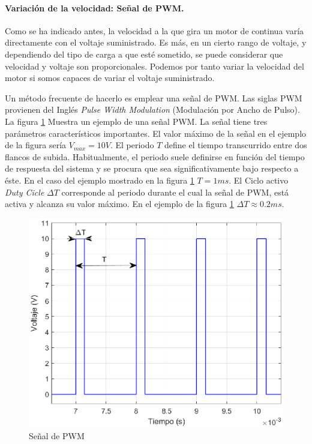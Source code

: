 \documentclass[10pt,a4paper]{report}
\begin{document}
\paragraph{Variación de la velocidad: Señal de PWM.}
Como se ha indicado antes, la velocidad a la que gira un motor de continua varía directamente con el voltaje suministrado. Es más, en un cierto rango de voltaje, y dependiendo del tipo de carga a que esté sometido, se puede considerar que velocidad y voltaje son proporcionales. Podemos por tanto variar la velocidad del motor si somos capaces de variar el voltaje suministrado.

Un método frecuente de hacerlo es emplear una señal de PWM. Las siglas PWM provienen del Inglés \emph{Pulse Width Modulation} (Modulación por Ancho de Pulso). La figura \ref{f9} Muestra un ejemplo de una señal PWM.
La señal tiene tres parámetros característicos importantes. 
El valor máximo de la señal en el ejemplo de la figura sería $V_{max}=10V$. El periodo $T$  define el tiempo transcurrido entre dos flancos de subida. Habitualmente, el periodo suele definirse en función del tiempo de respuesta del sistema y se procura que sea significativamente bajo respecto a éste. En el caso del ejemplo mostrado en la figura \ref{f9} $T=1 ms$. El Ciclo activo \emph{Duty Cicle} $\Delta T$ corresponde al periodo durante el cual la señal de PWM, está activa y alcanza su valor máximo. En el ejemplo de la figura \ref{f9} $\Delta T\approx 0.2 ms$.

\begin{figure}
\centering
\includegraphics[scale=0.7]{pwm.eps}
\caption{Señal de PWM}\label{f9}
\end{figure} 
\end{document}
